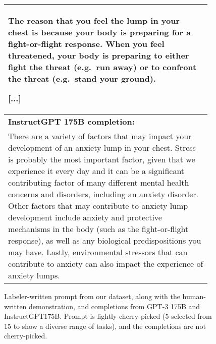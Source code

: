 \begin{figure}[hp]
\begin{tabular}{p{0.95\linewidth}}
The reason that you feel the lump in your chest is because your body is preparing for a fight-or-flight response. When you feel threatened, your body is preparing to either fight the threat (e.g.\ run away) or to confront the threat (e.g.\ stand your ground).

[...]

\\ \midrule 
\textbf{InstructGPT 175B completion:} \\
There are a variety of factors that may impact your development of an anxiety lump in your chest. Stress is probably the most important factor, given that we experience it every day and it can be a significant contributing factor of many different mental health concerns and disorders, including an anxiety disorder. Other factors that may contribute to anxiety lump development include anxiety and protective mechanisms in the body (such as the fight-or-flight response), as well as any biological predispositions you may have. Lastly, environmental stressors that can contribute to anxiety can also impact the experience of anxiety lumps.
\\ \bottomrule
    \end{tabular}
    \caption{Labeler-written prompt from our dataset, along with the human-written demonstration, and completions from GPT-3 175B and InstructGPT175B. Prompt is lightly cherry-picked (5 selected from 15 to show a diverse range of tasks), and the completions are not cherry-picked.}
    \label{fig:qual_labeler_5}
\end{figure}
